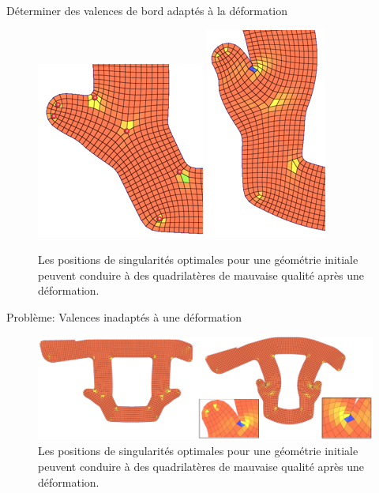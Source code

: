 \begin{frame}{Déterminer des valences de bord adaptés à la déformation}
    \small
    \begin{figure}
        \centering
        \includegraphics[width=0.46\linewidth]{img/quadsimu/coin_pb_0.PNG}
        \includegraphics[width=0.27\linewidth]{img/quadsimu/coin_pb_1.PNG}
        \caption{Les positions de singularités optimales pour une géométrie initiale peuvent conduire à des quadrilatères de mauvaise qualité après une déformation.}
        \label{fig:asp_ratio_pb}
    \end{figure}
\end{frame}
\fi
\begin{frame}{Problème: Valences inadaptés à une déformation}
    \begin{figure}
        \centering
        \includegraphics[width=\linewidth]{img/new_images/echec_simu.PNG}
        \caption{Les positions de singularités optimales pour une géométrie initiale peuvent conduire à des quadrilatères de mauvaise qualité après une déformation.}
    \end{figure}
\end{frame}
